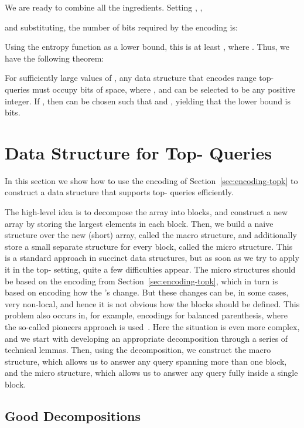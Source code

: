 \documentclass[runningheads]{llncs}
\begin{document}
We are ready to combine all the ingredients. Setting
, ,

and substituting, the number of bits required by the encoding is:

\noindent
Using the entropy function as a lower bound, this is at least
, where .  Thus, we
have the following theorem:

\begin{theorem}
\label{thm:top-k-lb}
For sufficiently large values of , any data structure that encodes
range top- queries must occupy  bits of space, where , and  can be selected to be any positive integer.  If , then
 can be chosen such that  and , yielding that the lower bound is  bits.
\end{theorem}


\section{\label{sec:datastructure}Data Structure for Top-\texorpdfstring{}{k} Queries}

In this section we show how to use the encoding of
Section~\ref{sec:encoding-topk} to construct a data structure that
supports top- queries efficiently.

The high-level idea is to decompose the array into blocks, and
construct a new array by storing the  largest elements in each
block.  Then, we build a naive structure over the new (short) array,
called the macro structure, and additionally store a small separate
structure for every block, called the micro structure. This is a
standard approach in succinct data structures, but as soon as we try
to apply it in the top- setting, quite a few difficulties
appear. The micro structures should be based on the encoding from
Section~\ref{sec:encoding-topk}, which in turn is based on encoding
how the 's change. But these changes can be, in some cases,
very non-local, and hence it is not obvious how the blocks should be
defined. This problem also occurs in, for example, encodings for
balanced parenthesis, where the so-called pioneers approach is
used~\cite{GRRR06}.  Here the situation is even more complex, and we
start with developing an appropriate decomposition through a series of
technical lemmas.  Then, using the decomposition, we construct the
macro structure, which allows us to answer any query spanning more
than one block, and the micro structure, which allows us to answer any
query fully inside a single block.

\subsection{Good Decompositions}
\end{document}
